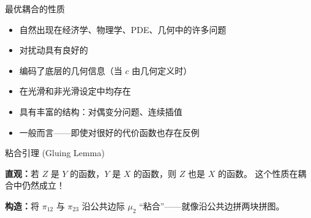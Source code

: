 \documentclass[aspectratio=169,10pt]{beamer}
\begin{document}
\begin{frame}{最优耦合的性质}
  \begin{TLtext}
    \begin{itemize}
      \item[\TLyes] 自然出现在经济学、物理学、PDE、几何中的许多问题
      \item[\TLyes] 对扰动具有良好的
      \item[\TLyes] 编码了底层的几何信息（当 $c$ 由几何定义时）
      \item[\TLyes] 在光滑和非光滑设定中均存在
      \item[\TLyes] 具有丰富的结构：对偶变分问题、连续插值
      \item[\TLno] 一般而言——即使对很好的代价函数也存在反例
    \end{itemize}
  \end{TLtext}

  \vspace{0.3em}
\end{frame}


\begin{frame}{粘合引理 (Gluing Lemma)}
  \begin{TLtext}
    \textbf{直观：}若 $Z$ 是 $Y$ 的函数，$Y$ 是 $X$ 的函数，则 $Z$ 也是 $X$ 的函数。
    这个性质在耦合中仍然成立！
  \end{TLtext}

  \vspace{0.5em}

  \vspace{0.3em}
  {\small\textbf{构造：}将 $\pi_{12}$ 与 $\pi_{23}$ 沿公共边际 $\mu_2$ ``粘合''——就像沿公共边拼两块拼图。}
\end{frame}
\end{document}
